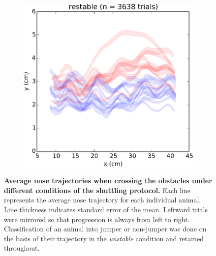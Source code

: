 \begin{figure}
\begin{subfigure}{.5\linewidth}
\label{fig:noseTrajectoryUnstable}
\end{subfigure}\\[1ex]
\begin{subfigure}{\linewidth}
\centering\includegraphics[width=.5\columnwidth]{chapters/figuresChBehaviour/noseTrajectoryRestable}
\label{fig:noseTrajectoryRestable}
\end{subfigure}
\caption{\textbf{Average nose trajectories when crossing the obstacles under different conditions of the shuttling protocol.} Each line represents the average nose trajectory for each individual animal. Line thickness indicates standard error of the mean. Leftward trials were mirrored so that progression is always from left to right. Classification of an animal into jumper or non-jumper was done on the basis of their trajectory in the \emph{unstable} condition and retained throughout.}
\label{fig:noseTrajectory}
\end{figure}


